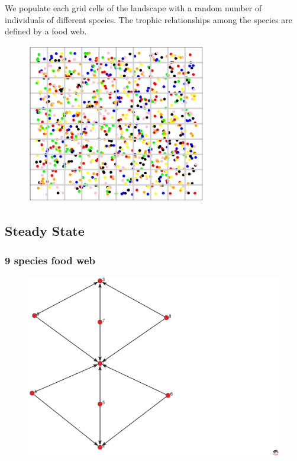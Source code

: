 \documentclass[xcolor=x11names,compress]{beamer}
\renewcommand{\(}{\begin{columns}}
\renewcommand{\)}{\end{columns}}
\newcommand{\<}[1]{\begin{column}{#1}}
\renewcommand{\>}{\end{column}}
\begin{document}
\begin{frame}
\centering We populate each grid cells of the landscape with a random number of individuals of different species. The trophic relationships among the species are defined by a food web.
\begin{figure}
\centering \includegraphics[width=0.7\textwidth]{./occuppiedlattice.eps}
\end{figure}
\end{frame}

\subsection{Steady State}


\begin{frame}
\frametitle{9 species food web}
\begin{figure}
\includegraphics[width=1.0\textwidth]{./FoodWeb_9species.eps}
\end{figure}
\end{frame}
\end{document}
